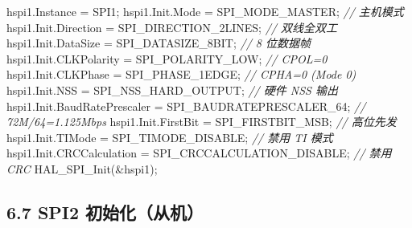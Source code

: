 \documentclass[
  chinese,
  UTF8,
  oneside,
  openany]{ctexbook}
\newenvironment{Shaded}{}{}
\newcommand{\CommentTok}[1]{\textcolor[rgb]{0.38,0.63,0.69}{\textit{#1}}}
\newcommand{\NormalTok}[1]{#1}
\newcommand{\OperatorTok}[1]{\textcolor[rgb]{0.40,0.40,0.40}{#1}}
\begin{document}
\begin{Shaded}
\begin{Highlighting}[]
\NormalTok{hspi1}\OperatorTok{.}\NormalTok{Instance }\OperatorTok{=}\NormalTok{ SPI1}\OperatorTok{;}
\NormalTok{hspi1}\OperatorTok{.}\NormalTok{Init}\OperatorTok{.}\NormalTok{Mode              }\OperatorTok{=}\NormalTok{ SPI\_MODE\_MASTER}\OperatorTok{;}           \CommentTok{// 主机模式}
\NormalTok{hspi1}\OperatorTok{.}\NormalTok{Init}\OperatorTok{.}\NormalTok{Direction         }\OperatorTok{=}\NormalTok{ SPI\_DIRECTION\_2LINES}\OperatorTok{;}      \CommentTok{// 双线全双工}
\NormalTok{hspi1}\OperatorTok{.}\NormalTok{Init}\OperatorTok{.}\NormalTok{DataSize          }\OperatorTok{=}\NormalTok{ SPI\_DATASIZE\_8BIT}\OperatorTok{;}         \CommentTok{// 8 位数据帧}
\NormalTok{hspi1}\OperatorTok{.}\NormalTok{Init}\OperatorTok{.}\NormalTok{CLKPolarity       }\OperatorTok{=}\NormalTok{ SPI\_POLARITY\_LOW}\OperatorTok{;}          \CommentTok{// CPOL=0}
\NormalTok{hspi1}\OperatorTok{.}\NormalTok{Init}\OperatorTok{.}\NormalTok{CLKPhase          }\OperatorTok{=}\NormalTok{ SPI\_PHASE\_1EDGE}\OperatorTok{;}           \CommentTok{// CPHA=0 (Mode 0)}
\NormalTok{hspi1}\OperatorTok{.}\NormalTok{Init}\OperatorTok{.}\NormalTok{NSS               }\OperatorTok{=}\NormalTok{ SPI\_NSS\_HARD\_OUTPUT}\OperatorTok{;}       \CommentTok{// 硬件 NSS 输出}
\NormalTok{hspi1}\OperatorTok{.}\NormalTok{Init}\OperatorTok{.}\NormalTok{BaudRatePrescaler }\OperatorTok{=}\NormalTok{ SPI\_BAUDRATEPRESCALER\_64}\OperatorTok{;}  \CommentTok{// 72M/64=1.125Mbps}
\NormalTok{hspi1}\OperatorTok{.}\NormalTok{Init}\OperatorTok{.}\NormalTok{FirstBit          }\OperatorTok{=}\NormalTok{ SPI\_FIRSTBIT\_MSB}\OperatorTok{;}          \CommentTok{// 高位先发}
\NormalTok{hspi1}\OperatorTok{.}\NormalTok{Init}\OperatorTok{.}\NormalTok{TIMode            }\OperatorTok{=}\NormalTok{ SPI\_TIMODE\_DISABLE}\OperatorTok{;}        \CommentTok{// 禁用 TI 模式}
\NormalTok{hspi1}\OperatorTok{.}\NormalTok{Init}\OperatorTok{.}\NormalTok{CRCCalculation    }\OperatorTok{=}\NormalTok{ SPI\_CRCCALCULATION\_DISABLE}\OperatorTok{;} \CommentTok{// 禁用 CRC}
\NormalTok{HAL\_SPI\_Init}\OperatorTok{(\&}\NormalTok{hspi1}\OperatorTok{);}
\end{Highlighting}
\end{Shaded}

\subsection{6.7 SPI2
初始化（从机）}\label{spi2-ux521dux59cbux5316ux4eceux673a}
\end{document}
